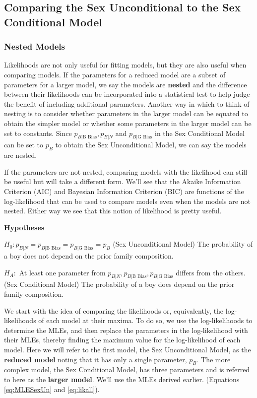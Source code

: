 \documentclass[
]{krantz}
\newcommand{\neutral}{p_{B|N}}
\newcommand{\gbias}{p_{B|\textrm{G Bias}}}
\newcommand{\bbias}{p_{B|\textrm{B Bias}}}
\begin{document}
\hypertarget{sec-lrtest}{%
\subsection{Comparing the Sex Unconditional to the Sex Conditional Model}\label{sec-lrtest}}

\hypertarget{nested-models}{%
\subsubsection{Nested Models}\label{nested-models}}

Likelihoods are not only useful for fitting models, but they are also useful when comparing models. If the parameters for a reduced model are a subset of parameters for a larger model, we say the models are \textbf{nested} and the difference between their likelihoods can be incorporated into a statistical test to help judge the benefit of including additional parameters. Another way in which to think of nesting is to consider whether parameters in the larger model can be equated to obtain the simpler model or whether some parameters in the larger model can be set to constants. Since \(\bbias, \neutral\) and \(\gbias\) in the Sex Conditional Model can be set to \(p_B\) to obtain the Sex Unconditional Model, we can say the models are nested.

If the parameters are not nested, comparing models with the likelihood can still be useful but will take a different form. We'll see that the Akaike Information Criterion (AIC) and Bayesian Information Criterion (BIC) are functions of the log-likelihood that can be used to compare models even when the models are not nested. Either way we see that this notion of likelihood is pretty useful.

\textbf{Hypotheses}

\(H_0: \neutral=\bbias=\gbias=p_B\) (Sex Unconditional Model)
The probability of a boy does not depend on the prior family composition.

\(H_A:\) At least one parameter from \(\neutral, \bbias,\gbias\) differs from the others. (Sex Conditional Model)
The probability of a boy does depend on the prior family composition.

We start with the idea of comparing the likelihoods or, equivalently, the log-likelihoods of each model at their maxima. To do so, we use the log-likelihoods to determine the MLEs, and then replace the parameters in the log-likelihood with their MLEs, thereby finding the maximum value for the log-likelihood of each model. Here we will refer to the first model, the Sex Unconditional Model, as the \textbf{reduced model} noting that it has only a single parameter, \(p_B\). The more complex model, the Sex Conditional Model, has three parameters and is referred to here as the \textbf{larger model}. We'll use the MLEs derived earlier. (Equations \eqref{eq:MLESexUn} and \eqref{eq:likall}).
\end{document}
